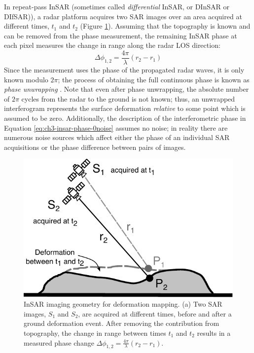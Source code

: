 In repeat-pass InSAR (sometimes called \emph{differential} InSAR, or DInSAR or DIfSAR)), a radar platform acquires two SAR images over an area acquired at different times, $t_1$ and $t_2$ (Figure \ref{fig:ch3-insar-geometry-defo}). Assuming that the topography is known and can be removed from the phase measurement, the remaining InSAR phase at each pixel measures the change in range along the radar LOS direction:
\begin{equation}
	\Delta \phi_{1,2} = \frac{4 \pi}{\lambda}(r_2 - r_1)   \label{eq:ch3-insar-phase-0noise}
\end{equation} 
Since the measurement uses the phase of the propagated radar waves, it is only known modulo $2\pi$; the process of obtaining the full continuous phase is known as \emph{phase unwrapping}
\citep{Goldstein1988SatelliteRadarInterferometry, Chen2001TwoDimensionalPhase}. Note that even after phase unwrapping, the absolute number of $2\pi$ cycles from the radar to the ground is not known; thus, an unwrapped interferogram represents the surface deformation \emph{relative} to some point which is assumed to be zero.
Additionally, the description of the interferometric phase in Equation \eqref{eq:ch3-insar-phase-0noise} assumes no noise; in reality there are numerous noise sources which affect either the phase of an individual SAR acquisitions or the phase difference between pairs of images.



\begin{figure}
	\centering
	\includegraphics[width=0.9\linewidth]{figures/chapter3-sar/ch3-insar-geometry-defo.pdf}
	\caption[InSAR imaging geometry for deformation mapping]{InSAR imaging geometry for deformation mapping.
		(a) Two SAR images, $S_1$ and $S_2$, are acquired at different times, before and after a ground deformation event. After removing the contribution from topography, the change in range between times $t_1$ and $t_2$ results in a measured phase change $\Delta \phi_{1,2} =  \frac{4 \pi}{\lambda}(r_2 - r_1)$.
	}
	\label{fig:ch3-insar-geometry-defo}
\end{figure}

